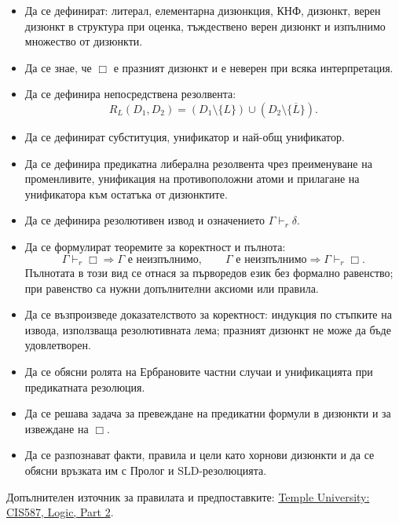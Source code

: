 \begin{itemize}
\item Да се дефинират: литерал, елементарна дизюнкция, КНФ, дизюнкт, верен дизюнкт в структура при оценка, тъждествено верен дизюнкт и изпълнимо множество от дизюнкти.
\item Да се знае, че $\Box$ е празният дизюнкт и е неверен при всяка интерпретация.
\item Да се дефинира непосредствена резолвента:
\[
R_L(D_1,D_2)=
(D_1\setminus\{L\})\cup(D_2\setminus\{\overline L\}).
\]
\item Да се дефинират субституция, унификатор и най-общ унификатор.
\item Да се дефинира предикатна либерална резолвента чрез преименуване на променливите, унификация на противоположни атоми и прилагане на унификатора към остатъка от дизюнктите.
\item Да се дефинира резолютивен извод и означението $\Gamma\vdash_r\delta$.
\item Да се формулират теоремите за коректност и пълнота:
\[
\Gamma\vdash_r\Box\Rightarrow\Gamma\text{ е неизпълнимо},
\qquad
\Gamma\text{ е неизпълнимо}\Rightarrow\Gamma\vdash_r\Box.
\]
Пълнотата в този вид се отнася за първоредов език без формално равенство; при равенство са нужни допълнителни аксиоми или правила.
\item Да се възпроизведе доказателството за коректност: индукция по стъпките на извода, използваща резолютивната лема; празният дизюнкт не може да бъде удовлетворен.
\item Да се обясни ролята на Ербрановите частни случаи и унификацията при предикатната резолюция.
\item Да се решава задача за превеждане на предикатни формули в дизюнкти и за извеждане на $\Box$.
\item Да се разпознават факти, правила и цели като хорнови дизюнкти и да се обясни връзката им с Пролог и SLD-резолюцията.
\end{itemize}

\begin{remark}
Допълнителен източник за правилата и предпоставките: \href{https://cis.temple.edu/~giorgio/cis587/readings/logic2.html}{Temple University: CIS587, Logic, Part 2}.
\end{remark}
